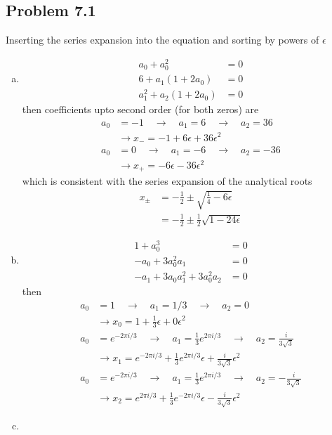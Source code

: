 \documentclass[../main.tex]{subfiles}
\begin{document}
\subsection{Problem 7.1}
Inserting the series expansion into the equation and sorting by powers of $\epsilon$
\begin{enumerate}[(a)]
\item 
\begin{align}
a_0+a_0^2&=0\\
6+a_1(1+2a_0)&=0\\
a_1^2+a_2(1+2a_0)&=0
\end{align}
then coefficients upto second order (for both zeros) are
\begin{align}
a_0&=-1\quad\rightarrow\quad a_1=6\quad\rightarrow\quad a_2=36\\
&\rightarrow x_{-}=-1+6\epsilon+36\epsilon^2\\
a_0&=0\quad\rightarrow\quad a_1=-6\quad\rightarrow\quad a_2=-36\\
&\rightarrow x_{+}=-6\epsilon-36\epsilon^2
\end{align}
which is consistent with the series expansion of the analytical roots
\begin{align}
x_{\pm}
&=-\frac{1}{2}\pm\sqrt{\frac{1}{4}-6\epsilon}\\
&=-\frac{1}{2}\pm\frac{1}{2}\sqrt{1-24\epsilon}
\end{align}

\item 
\begin{align}
1 + a_0^3&=0\\
-a_0 + 3a_0^2 a_1&=0\\
-a_1 + 3a_0 a_1^2 + 3 a_0^2 a_2&=0
\end{align}
then
\begin{align}
a_0&=1\quad\rightarrow\quad a_1=1/3\quad\rightarrow\quad a_2=0\\
&\rightarrow x_0=1+\frac{1}{3}\epsilon+0\epsilon^2\\
%
a_0&=e^{-2\pi i/3}\quad\rightarrow\quad a_1=\frac{1}{3}e^{2\pi i/3}\quad\rightarrow\quad a_2=\frac{i}{3\sqrt{3}}\\
&\rightarrow x_1
=e^{-2\pi i/3}+\frac{1}{3}e^{2\pi i/3}\epsilon+\frac{i}{3\sqrt{3}}\epsilon^2\\
%
a_0&=e^{-2\pi i/3}\quad\rightarrow\quad a_1=\frac{1}{3}e^{2\pi i/3}\quad\rightarrow\quad a_2=-\frac{i}{3\sqrt{3}}\\
&\rightarrow x_2
=e^{2\pi i/3}+\frac{1}{3}e^{-2\pi i/3}\epsilon-\frac{i}{3\sqrt{3}}\epsilon^2
\end{align}
\item
\end{enumerate}
\end{document}
